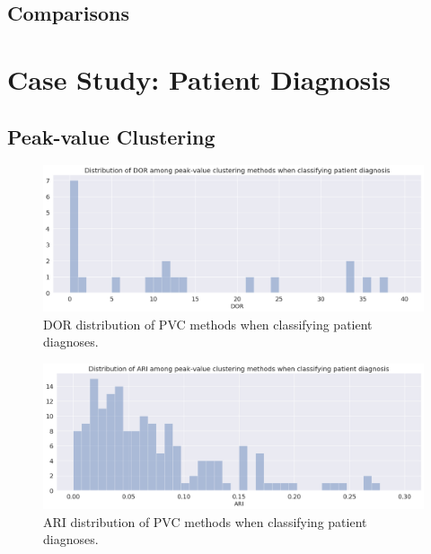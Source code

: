 
\subsection{Comparisons}

\newpage

\section{Case Study: Patient Diagnosis}

\subsection{Peak-value Clustering}

\begin{figure}[h!]
    \begin{center}
    \includegraphics[width=\textwidth]{results/pvc-ind-dor.png}
    \end{center}
    \caption{DOR distribution of PVC methods when classifying patient diagnoses.}
    \label{fig:pvc_ind_dor}
\end{figure}

\begin{figure}[h!]
    \begin{center}
    \includegraphics[width=\textwidth]{results/pvc-ind-ari.png}
    \end{center}
    \caption{ARI distribution of PVC methods when classifying patient diagnoses.}
    \label{fig:pvc_ind_ari}
\end{figure}

